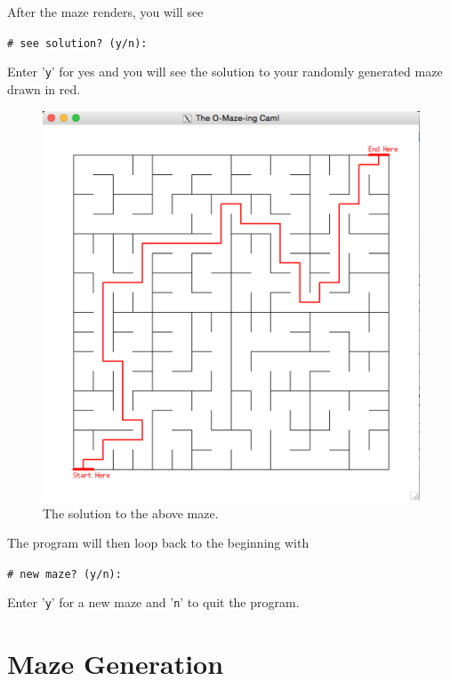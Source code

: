 \documentclass[11pt, margin=1in]{article}
\begin{document}
After the maze renders, you will see 

\begin{flushleft}
\quad \quad \texttt{\# see solution? (y/n):}
\end{flushleft}

 
Enter '\texttt{y}' for yes and you will see the solution to your randomly generated maze drawn in red.

\begin{figure}[H]
\begin{center}
\includegraphics[scale=0.32]{solution.jpg}
\caption{The solution to the above maze.}
\end{center}
\end{figure}


 The program will then loop back to the beginning with 

\begin{flushleft}
\quad \quad \texttt{\# new maze? (y/n): } 
\end{flushleft}


Enter '\texttt{y}' for a new maze and  '\texttt{n}' to quit the program.


    

\section{Maze Generation}
\end{document}
